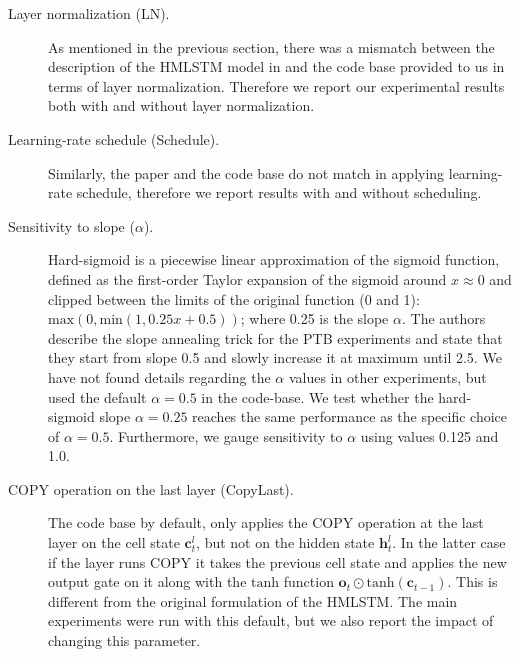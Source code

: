 \begin{description}

\item[Layer normalization (LN).]
As mentioned in the previous section, there was a mismatch between the 
description of the HMLSTM model in \citet{chung2016hierarchical} and 
the code base provided to us in terms of layer normalization. Therefore 
we report our experimental results both with and without layer normalization.

\item[Learning-rate schedule (Schedule).] Similarly, the paper and the
code base do not match in applying learning-rate schedule, therefore we 
report results with and without scheduling.

\item[Sensitivity to slope ($\alpha$).] Hard-sigmoid \citep{gulcehre2016noisy} 
is a piecewise linear approximation of the sigmoid function, defined as the
first-order Taylor expansion of the sigmoid around $x \approx 0$ and
clipped between the limits of the original function (0 and 1): 
$\text{max}(0, \text{min}(1,0.25x + 0.5) )$; where 0.25 is the 
slope $\alpha$. The authors describe the slope annealing trick for the 
PTB experiments and state that they start from slope 0.5 and slowly 
increase it at maximum until 2.5. We have not found details regarding 
the $\alpha$ values in other experiments, but used the default 
$\alpha=0.5$ in the code-base.  We test whether the hard-sigmoid slope 
$\alpha = 0.25$ reaches the same performance as the 
specific choice of $\alpha=0.5$. Furthermore, we gauge sensitivity to $\alpha$ using values 0.125 and 1.0.



\item[COPY operation on the last layer (CopyLast).]
The code base by default, only applies the COPY operation at the 
last layer on the cell state $\mathbf{c}^{l}_t$, but not on the 
hidden state $\mathbf{h}^{l}_t$. In the latter case if the layer 
runs COPY it takes the previous cell state and applies the new 
output gate on it along with the $\mathrm{tanh}$ function 
$\mathbf{o}_t \odot \mathrm{tanh}(\mathbf{c}_{t-1})$. This is different 
from the original formulation of the HMLSTM. The main experiments 
were run with this default, but we also report the impact of changing this parameter.


\end{description}
